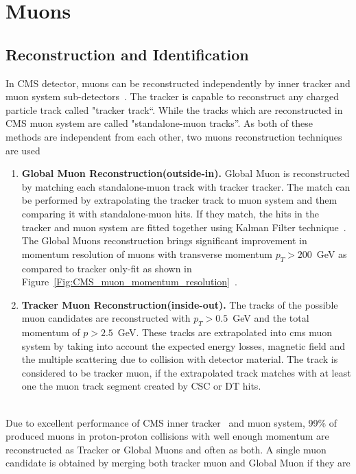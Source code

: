 \section{Muons}\label{chapter3_sec2}
\subsection{Reconstruction  and Identification}
In CMS detector, muons can be reconstructed independently by inner tracker and muon system sub-detectors~\cite{cms:38a}. The tracker is capable to reconstruct
any charged 
particle track called "tracker track``. While the tracks which are reconstructed in CMS muon system are called "standalone-muon tracks''. As both of these
methods are independent from each other, two muons reconstruction techniques are used 

\begin{enumerate}
 \item \textbf{Global Muon Reconstruction(outside-in).} Global Muon is reconstructed by matching each standalone-muon track with tracker tracker. The 
 match can be performed by extrapolating the tracker track to muon system and them comparing it with standalone-muon hits. If they match,  the hits in 
 the tracker and muon system are fitted together using Kalman Filter technique~\cite{cms:38b}. The Global Muons reconstruction brings significant improvement
 in momentum resolution of muons with transverse momentum $p_T > 200$~GeV as compared to tracker only-fit as shown in
 Figure~\ref{Fig:CMS_muon_momentum_resolution}~\cite{cms:muonsystem_TDR_2,cms:38c}.
 \item \textbf{Tracker Muon Reconstruction(inside-out).} The tracks of the possible muon candidates are reconstructed with $p_T > 0.5$~GeV and the total 
 momentum of $p > 2.5$~GeV. These tracks are extrapolated into cms muon system by taking into account the expected energy losses, magnetic field and 
 the multiple scattering due to collision with detector material. The track is considered to be tracker muon, if the extrapolated track matches with 
 at least one the muon track segment created by CSC or DT hits. 
 \end{enumerate}
\\ Due to excellent performance of CMS inner tracker~\cite{cms:38d} and muon system, 99\% of produced muons in proton-proton collisions with well enough momentum 
are 
   reconstructed as Tracker or Global Muons and often as both. A single muon candidate is obtained by merging both tracker muon and Global Muon if they are
